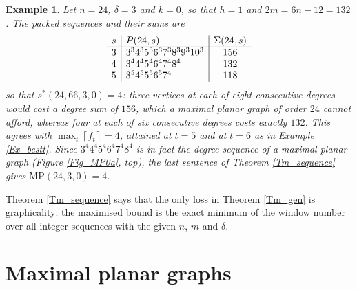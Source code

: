 \documentclass[10pt,a4paper]{article}
\newtheorem{example}[theorem]{Example}
\begin{document}
\begin{example}
\label{Ex_sstar}Let $n=24$, $\delta =3$ and $k=0$, so that $h=1$ and
$2m=6n-12=132$. The packed sequences and their sums are
\[
\begin{array}
[c]{c|l|c}%
s & P(24,s) & \Sigma (24,s)\\\hline
3 & 3^{3}4^{3}5^{3}6^{3}7^{3}8^{3}9^{3}10^{3} & 156\\
4 & 3^{4}4^{4}5^{4}6^{4}7^{4}8^{4} & 132\\
5 & 3^{5}4^{5}5^{5}6^{5}7^{4} & 118
\end{array}
\]
so that $s^{\ast }(24,66,3,0)=4$: three vertices at each of eight consecutive
degrees would cost a degree sum of $156$, which a maximal planar graph of order $24$
cannot afford, whereas four at each of six consecutive degrees costs exactly
$132$. This agrees with $\max_{t}\left\lceil f_{t}\right\rceil =4$, attained at
$t=5$ and at $t=6$ as in Example \ref{Ex_bestt}. Since
$3^{4}4^{4}5^{4}6^{4}7^{4}8^{4}$ is in fact the degree sequence of a
maximal planar graph (Figure \ref{Fig_MP0a}, top), the last sentence of Theorem
\ref{Tm_sequence} gives $\mathrm{MP}(24,3,0)=4$.
\end{example}



Theorem \ref{Tm_sequence} says that the only loss in Theorem \ref{Tm_gen} is graphicality: the maximised bound is
the exact minimum of the window number over all integer sequences with the given $n$, $m$ and $\delta $.

\section{Maximal planar graphs}
\label{Sec_planar}
\end{document}

